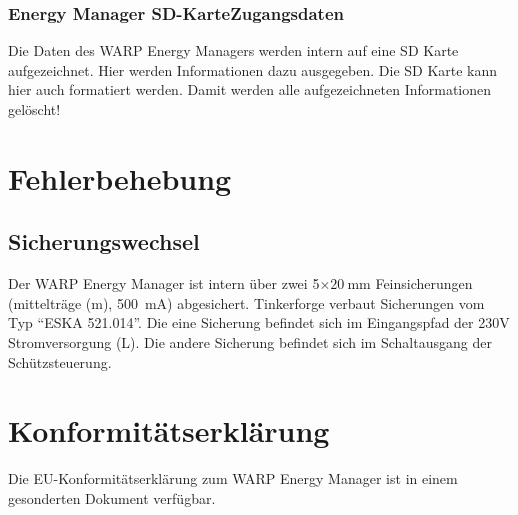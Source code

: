 \documentclass[a4paper,10pt]{article}
\begin{document}
\begin{multicols*}{2}
	\subsubsection{Energy Manager SD-KarteZugangsdaten}\label{zugangsdaten}
	Die Daten des WARP Energy Managers werden intern auf eine SD Karte
	aufgezeichnet. Hier werden Informationen dazu ausgegeben. Die SD Karte kann
	hier auch formatiert werden. Damit werden alle aufgezeichneten Informationen
	gelöscht!

	\subsubsection{}\label{zugangsdaten}

	\newpage
	\section{Fehlerbehebung}

	\subsection{Sicherungswechsel}
	Der WARP Energy Manager ist intern über zwei 5$\times\SI{20}{\milli\meter}$ Feinsicherungen (mittelträge (m), \SI{500}{\milli\ampere}) abgesichert.
	Tinkerforge verbaut Sicherungen vom Typ \enquote{ESKA 521.014}. Die eine
	Sicherung befindet sich im Eingangspfad der 230V Stromversorgung (L). Die
	andere Sicherung befindet sich im Schaltausgang der Schützsteuerung.

	\section{Konformitätserklärung}
	Die EU-Konformitätserklärung zum WARP Energy Manager ist in einem gesonderten Dokument verfügbar.


\end{multicols*}
\end{document}
